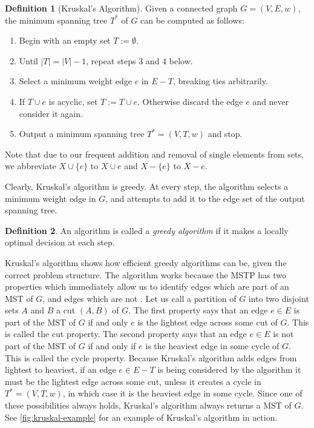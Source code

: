 \documentclass[a4paper,11pt]{report}
\theoremstyle{plain}
\theoremstyle{definition}
\newtheorem{defn}[defn]{Definition}
\begin{document}
\begin{defn}[Kruskal's Algorithm]
Given a connected graph $G = (V,E,w)$, the minimum spanning tree $T^*$ of
$G$ can be computed as follows:
\begin{enumerate}
    \item Begin with an empty set $T := \emptyset$.
    \item Until $|T| = |V| - 1$, repeat steps 3 and 4 below.
    \item Select a minimum weight edge $e$ in $E - T$, breaking ties
    arbitrarily.
    \item If $T \cup e$ is acyclic, set $T := T \cup e$. Otherwise discard
    the edge $e$ and never consider it again.
    \item Output a minimum spanning tree $T^* = (V,T,w)$ and stop.
\end{enumerate}
\end{defn}

Note that due to our frequent addition and removal of single elements from
sets, we abbreviate $X \cup \{e\}$ to $X \cup e$ and $X - \{e\}$ to $X - e$.

Clearly, Kruskal's algorithm is greedy. At every step, the algorithm
selects a minimum weight edge in $G$, and attempts to add it to the edge set
of the output spanning tree.

\begin{defn}
An algorithm is called a \emph{greedy algorithm} if it makes a locally optimal
decision at each step.
\end{defn}

Kruskal's algorithm shows how efficient greedy algorithms can be, given the
correct problem structure. The algorithm works because the MSTP has two
properties which immediately allow us to identify edges which are part of an
MST of $G$, and edges which are not \cite[pp. 10--11]{eisner}. Let us call a
partition of $G$ into two disjoint sets $A$ and $B$ a cut $(A,B)$ of $G$. The
first property says that an edge $e \in E$ is part of the MST of $G$ if and
only $e$ is the lightest edge across some cut of $G$. This is called the cut
property. The second property says that an edge $e \in E$ is not part of the
MST of $G$ if and only if $e$ is the heaviest edge in some cycle of $G$. This
is called the cycle property.  Because Kruskal's algorithm adds edges from
lightest to heaviest, if an edge $e \in E - T$ is being considered by the
algorithm it must be the lightest edge across some cut, unless it creates a
cycle in $T^* = (V,T,w)$, in which case it is the heaviest edge in some cycle.
Since one of these possibilities always holds, Kruskal's algorithm always
returns a MST of $G$. See \autoref{fig:kruskal-example} for an example of
Kruskal's algorithm in action.
\end{document}
